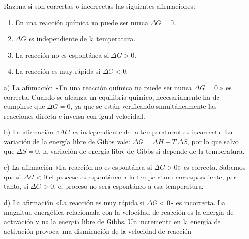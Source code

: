 \begin{exercise}
    Razona si son correctas o incorrectas las siguientes afirmaciones:

    \begin{enumerate}[label=\letraminuscula]
    \item En una reacción química no puede ser nunca \(\Delta G = 0\).
    \item \(\Delta G\) es independiente de la temperatura.
    \item La reacción no es espontánea si \(\Delta G > 0\).
    \item La reacción es muy rápida si \(\Delta G < 0\).
    \end{enumerate}


    \begin{solu}

        a) La afirmación «En una reacción química no puede ser nunca \(\Delta G = 0\) » es correcta. Cuando se
        alcanza un equilibrio químico, necesariamente ha de cumplirse que \(\Delta G = 0\), ya que se están
        verificando simultáneamente las reacciones directa e inversa con igual velocidad.

        b) La afirmación «\(\Delta G\) es independiente de la temperatura» es incorrecta. La variación de la energía libre de Gibbs vale: \(\Delta G = \Delta H - T\ \Delta S\), por lo que salvo que \(\Delta S = 0\), la variación de energía libre de Gibbs si depende de la temperatura.

        c) La afirmación «La reacción no es espontánea si \(\Delta G > 0\)» es correcta. Sabemos que si \(\Delta G < 0\) el proceso es espontáneo a la temperatura correspondiente, por tanto, si \(\Delta G > 0\), el proceso no
        será espontáneo a esa temperatura.

        d) La afirmación «La reacción es muy rápida si \(\Delta G < 0\)» es incorrecta. La magnitud energética
        relacionada con la velocidad de reacción es la energía de activación y no la energía libre de
        Gibbs. Un incremento en la energía de activación provoca una disminución de la velocidad de
        reacción

    \end{solu}
\end{exercise}
